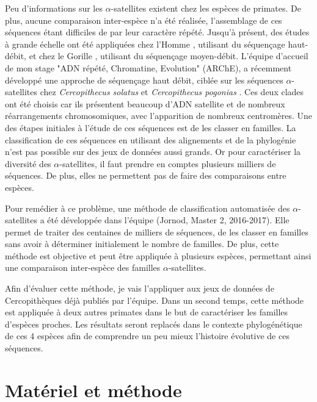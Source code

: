\documentclass[12pt,a4paper]{article}
\begin{document}
Peu d'informations sur les $\alpha$-satellites existent chez les espèces de primates. De plus, aucune comparaison inter-espèce n'a été réalisée, l'assemblage de ces séquences étant difficiles de par leur caractère répété. Jusqu'à présent, des études à grande échelle ont été appliquées chez l'Homme \cite{Alexandrov2001}, utilisant du séquençage haut-débit,  et chez le Gorille \cite{Catacchio2015}, utilisant du séquençage moyen-débit. L'équipe d'accueil de mon stage "ADN répété, Chromatine, Evolution" (ARChE), a récemment développé une approche de séquençage haut débit, ciblée sur les séquences $\alpha$-satellites chez \textit{Cercopithecus solatus} \cite{Cacheux2016} et \textit{Cercopithecus pogonias} \cite{Cacheux2018}. Ces deux clades ont été choisis car ils présentent beaucoup d'ADN satellite et de nombreux réarrangements chromosomiques, avec l'apparition de nombreux centromères. Une des étapes initiales à l'étude de ces séquences est de les classer en familles. La classification de ces séquences en utilisant des alignements et de la phylogénie n'est pas possible sur des jeux de données aussi grands. Or pour caractériser la diversité des $\alpha$-satellites, il faut prendre en comptes plusieurs milliers de séquences. De plus, elles ne permettent pas de faire des comparaisons entre espèces.

Pour remédier à ce problème, une méthode de classification automatisée des $\alpha$-satellites a été développée dans l'équipe (Jornod, Master 2, 2016-2017). Elle permet de traiter des centaines de milliers de séquences, de les classer en familles sans avoir à déterminer initialement le nombre de familles. De plus, cette méthode est objective et peut être appliquée à plusieurs espèces, permettant ainsi une comparaison inter-espèce des familles $\alpha$-satellites. 

Afin d'évaluer cette méthode, je  vais l'appliquer aux jeux de données de Cercopithèques déjà publiés par l'équipe. Dans un second temps, cette méthode est appliquée à deux autres primates dans le but de  caractériser les familles d'espèces proches. Les résultats seront replacés dans le contexte phylogénétique de ces 4 espèces afin de comprendre un peu mieux l'histoire évolutive de ces séquences.

\section{Matériel et méthode}
\end{document}
